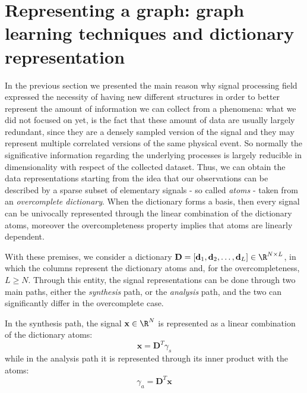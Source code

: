 \chapter*{Representing a graph: graph learning techniques and dictionary representation}
In the previous section we presented the main reason why signal processing field expressed the necessity of having new different structures in order to better represent the amount of information we can collect from a phenomena: what we did not focused on yet, is the fact that these amount of data are usually largely redundant, since they are a densely sampled version of the signal and they may represent multiple correlated versions of the same physical event. So normally the significative information regarding the underlying processes is largely reducible in dimensionality with respect of the collected dataset. \cite{Tosic2011} Thus, we can obtain the data representations starting from the idea that our observations can be described by a sparse subset of elementary signals - so called \textit{atoms} - taken from an \textit{overcomplete dictionary}. When the dictionary forms a basis, then every signal can be univocally represented through the linear combination of the dictionary atoms, moreover the overcompleteness property  implies that atoms are linearly dependent. \cite{Tosic2011} \cite{Rubinstein2010}

With these premises, we consider a dictionary $\textbf{D} = [\textbf{d}_1, \textbf{d}_2, \dots, \textbf{d}_L] \in \R^{N \times L}$, in which the columns represent the dictionary atoms and, for the overcompleteness, $L\geq N$. Through this entity, the signal representations can be done through two main paths, either the \textit{synthesis} path, or the \textit{analysis} path, and the two can significantly differ in the overcomplete case.

In the synthesis path, the signal $\textbf{x} \in \R^N$ is represented as a linear combination of the dictionary atoms:
\begin{equation}
\textbf{x} = \textbf{D}^T \gamma_s
\label{eq:synthesis}
\end{equation}
while in the analysis path it is represented through its inner product with the atoms:
\begin{equation}
\gamma_a = \textbf{D}^T \textbf{x}
\label{eq:analysis}
\end{equation}

